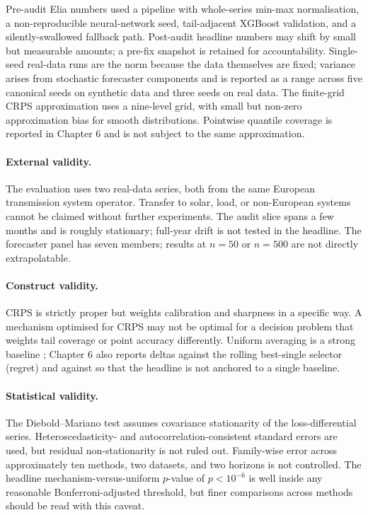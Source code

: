 \documentclass[
  11pt,
  a4paper,
  oneside]{report}
\begin{document}
Pre-audit Elia numbers used a pipeline with whole-series min-max
normalisation, a non-reproducible neural-network seed, tail-adjacent
XGBoost validation, and a silently-swallowed fallback path. Post-audit
headline numbers may shift by small but measurable amounts; a pre-fix
snapshot is retained for accountability. Single-seed real-data runs are
the norm because the data themselves are fixed; variance arises from
stochastic forecaster components and is reported as a range across five
canonical seeds on synthetic data and three seeds on real data. The
finite-grid CRPS approximation uses a nine-level grid, with small but
non-zero approximation bias for smooth distributions. Pointwise quantile
coverage is reported in Chapter 6 and is not subject to the same
approximation.

\paragraph{External validity.}

The evaluation uses two real-data series, both from the same European
transmission system operator. Transfer to solar, load, or non-European
systems cannot be claimed without further experiments. The audit slice
spans a few months and is roughly stationary; full-year drift is not
tested in the headline. The forecaster panel has seven members; results
at \(n = 50\) or \(n = 500\) are not directly extrapolatable.

\paragraph{Construct validity.}

CRPS is strictly proper \citep{gneiting2007strictly} but weights
calibration and sharpness in a specific way. A mechanism optimised for
CRPS may not be optimal for a decision problem that weights tail
coverage or point accuracy differently. Uniform averaging is a strong
baseline \citep{timmermann2006forecast}; Chapter 6 also reports deltas
against the rolling best-single selector (regret) and against
\citet{vitali2025intermittent} so that the headline is not anchored to a
single baseline.

\paragraph{Statistical validity.}

The Diebold--Mariano test assumes covariance stationarity of the
loss-differential series. Heteroscedasticity- and
autocorrelation-consistent standard errors are used, but residual
non-stationarity is not ruled out. Family-wise error across
approximately ten methods, two datasets, and two horizons is not
controlled. The headline mechanism-versus-uniform \(p\)-value of
\(p < 10^{-6}\) is well inside any reasonable Bonferroni-adjusted
threshold, but finer comparisons across methods should be read with this
caveat.
\end{document}
